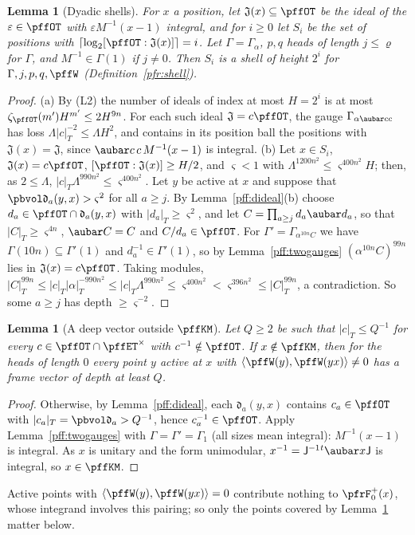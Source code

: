 \documentclass[10pt]{amsart}
\newtheorem{lemma}[theorem]{Lemma}
\theoremstyle{definition}
\theoremstyle{remark}
\begin{document}
\begin{lemma}[Dyadic shells]\label{pff:dyadic}
For $x$ a position, let $\mathfrak J(x)\subseteq\pffOT$ be the ideal of the $\varepsilon\in\pffOT$ with
$\varepsilon M^{-1}(x-1)$ integral, and for $i\ge0$ let $S_i$ be the set of positions with
$\lceil\log_2[\pffOT:\mathfrak J(x)]\rceil=i$. Let $\Gamma=\Gamma_\alpha$, $p,q$ heads of length $j\le\varrho$
for $\Gamma$, and $M^{-1}\in\Gamma(1)$ if $j\ne0$. Then $S_i$ is a shell of height $2^i$ for
$\Gamma,j,p,q,\pffW$ (Definition~\ref{pfr:shell}).
\end{lemma}
\begin{proof}
(a) By (L2) the number of ideals of index at most $H=2^i$ is at most $\zeta_{\pffOT}(m')H^{m'}\le2H^{9n}$.
For each such ideal $\mathfrak J=c\pffOT$, the gauge $\Gamma_{\alpha\aubar cc}$ has loss
$\Lambda|c|_T^{-2}\le\Lambda H^2$, and contains in its position ball the positions with $\mathfrak J(x)=
\mathfrak J$, since $\aubar c\,c\,M^{-1}(x-1)$ is integral. (b) Let $x\in S_i$, $\mathfrak J(x)=c\pffOT$,
$[\pffOT:\mathfrak J(x)]\ge H/2$, and $\varsigma<1$ with $\Lambda^{1200n^2}\le\varsigma^{400n^2}H$; then,
as $2\le\Lambda$, $|c|_T\Lambda^{990n^2}\le\varsigma^{400n^2}$. Let $y$ be active at $x$ and suppose that
$\pbvol\mathfrak d_a(y,x)>\varsigma^2$ for all $a\ge j$. By Lemma~\ref{pff:dideal}(b) choose $d_a\in\pffOT
\cap\mathfrak d_a(y,x)$ with $|d_a|_T\ge\varsigma^2$, and let $C=\prod_{a\ge j}d_a\aubar d_a$, so that
$|C|_T\ge\varsigma^{4n}$, $\aubar C=C$ and $C/d_a\in\pffOT$. For $\Gamma'=\Gamma_{\alpha^{10n}C}$ we have
$\Gamma(10n)\subseteq\Gamma'(1)$ and $d_a^{-1}\in\Gamma'(1)$, so by Lemma~\ref{pff:twogauges}
$(\alpha^{10n}C)^{99n}$ lies in $\mathfrak J(x)=c\pffOT$. Taking modules, $|C|_T^{99n}\le|c|_T|\alpha|_T^{-990n^2}\le|c|_T\Lambda^{990n^2}\le\varsigma^{400n^2}<
\varsigma^{396n^2}\le|C|_T^{99n}$, a contradiction. So some $a\ge j$ has depth $\ge\varsigma^{-2}$.
\end{proof}

\begin{lemma}[A deep vector outside $\pffKM$]\label{pff:deep}
Let $Q\ge2$ be such that $|c|_T\le Q^{-1}$ for every $c\in\pffOT\cap\pffET^\times$ with
$c^{-1}\notin\pffOT$. If $x\notin\pffKM$, then for the heads of length $0$ every point $y$ active at $x$
with $\langle\pffW(y),\pffW(yx)\rangle\ne0$ has a frame vector of depth at least $Q$.
\end{lemma}
\begin{proof}
Otherwise, by Lemma~\ref{pff:dideal}, each $\mathfrak d_a(y,x)$ contains $c_a\in\pffOT$ with
$|c_a|_T=\pbvol\mathfrak d_a>Q^{-1}$, hence $c_a^{-1}\in\pffOT$. Apply Lemma~\ref{pff:twogauges} with
$\Gamma=\Gamma'=\Gamma_1$ (all sizes mean integral): $M^{-1}(x-1)$ is integral. As $x$ is unitary and the form
unimodular, $x^{-1}=\mathsf J^{-1}{}^t\aubar x\mathsf J$ is integral, so $x\in\pffKM$.
\end{proof}
Active points with $\langle\pffW(y),\pffW(yx)\rangle=0$ contribute nothing to $\pfrF_0^+(x)$, whose
integrand involves this pairing; so only the points covered by Lemma~\ref{pff:deep} matter below.
\end{document}
